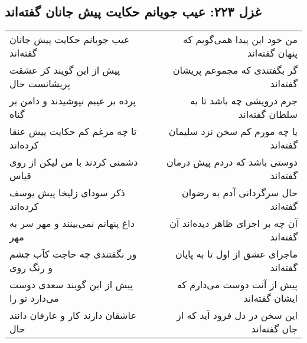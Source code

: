 \begin{center}
\section*{غزل ۲۲۳: عیب جویانم حکایت پیش جانان گفته‌اند}
\label{sec:223}
\begin{longtable}{l p{0.5cm} r}
عیب جویانم حکایت پیش جانان گفته‌اند
&&
من خود این پیدا همی‌گویم که پنهان گفته‌اند
\\
پیش از این گویند کز عشقت پریشانست حال
&&
گر بگفتندی که مجموعم پریشان گفته‌اند
\\
پرده بر عیبم نپوشیدند و دامن بر گناه
&&
جرم درویشی چه باشد تا به سلطان گفته‌اند
\\
تا چه مرغم کم حکایت پیش عنقا کرده‌اند
&&
یا چه مورم کم سخن نزد سلیمان گفته‌اند
\\
دشمنی کردند با من لیکن از روی قیاس
&&
دوستی باشد که دردم پیش درمان گفته‌اند
\\
ذکر سودای زلیخا پیش یوسف کرده‌اند
&&
حال سرگردانی آدم به رضوان گفته‌اند
\\
داغ پنهانم نمی‌بینند و مهر سر به مهر
&&
آن چه بر اجزای ظاهر دیده‌اند آن گفته‌اند
\\
ور نگفتندی چه حاجت کآب چشم و رنگ روی
&&
ماجرای عشق از اول تا به پایان گفته‌اند
\\
پیش از این گویند سعدی دوست می‌دارد تو را
&&
پیش از آنت دوست می‌دارم که ایشان گفته‌اند
\\
عاشقان دارند کار و عارفان دانند حال
&&
این سخن در دل فرود آید که از جان گفته‌اند
\\
\end{longtable}
\end{center}
